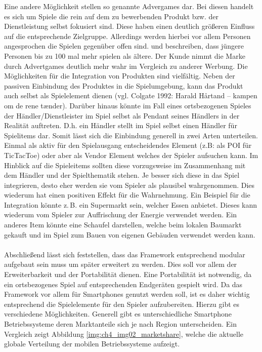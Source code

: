 Eine andere Möglichkeit stellen so genannte Advergames dar. Bei diesen handelt es sich um Spiele die rein auf dem zu bewerbenden Produkt bzw. der Dienstleistung selbst fokusiert sind. Diese haben einen deutlich größeren Einfluss auf die entsprechende Zielgruppe. Allerdings werden hierbei vor allem Personen angesprochen die Spielen gegenüber offen sind.\cite{Winkler.2006} \textcite{Chen.2001} und \textcite{Dahl.2009} beschreiben, dass jüngere Personen bis zu 100 mal mehr spielen als ältere. Der Kunde nimmt die Marke durch Advertgames deutlich mehr wahr im Vergleich zu anderer Werbung.
Die Möglichkeiten für die Integration von Produkten sind vielfältig. Neben der passiven Einbindung des Produktes in die Spielumgebung, kann das Produkt auch selbst als Spielelement dienen (vgl. Colgate 1992: Harald Hårtand -- kampen om de rene tænder).
Darüber hinaus könnte im Fall eines ortsbezogenen Spieles der Händler/Dienstleister im Spiel selbst als Pendant seines Händlers in der Realität auftreten. D.h. ein Händler stellt im Spiel selbst einen Händler für Spielitems dar.
Somit lässt sich die Einbindung generell in zwei Arten unterteilen. Einmal als aktiv für den Spielausgang entscheidendes Element (z.B: als POI für TicTacToe) oder aber als Vendor Element welches der Spieler aufsuchen kann.
Im Hinblick auf die Spieleitems sollten diese vorzugsweise im Zusammenhang mit dem Händler und der Spielthematik stehen. Je besser sich diese in das Spiel integrieren, desto eher werden sie vom Spieler als plausibel wahrgenommen. Dies wiederum hat einen positiven Effekt für die Wahrnehmung.
Ein Beispiel für die Integration könnte z.\,B. ein Supermarkt sein, welcher Essen anbietet. Dieses kann wiederum vom Spieler zur Auffrischung der Energie verwendet werden. Ein anderes Item könnte eine Schaufel darstellen, welche beim lokalen Baumarkt gekauft und im Spiel zum Bauen von eigenen Gebäuden verwendet werden kann.
\\\\
Abschließend lässt sich feststellen, dass das Framework entsprechend modular aufgebaut sein muss um später erweitert zu werden. Dies soll vor allem der Erweiterbarkeit und der Portabilität dienen. Eine Portabilität ist notwendig, da ein ortsbezogenes Spiel auf entsprechenden Endgeräten gespielt wird. Da das Framework vor allem  für Smartphones genutzt werden soll, ist es daher wichtig entsprechend die Spielelemente für den Spieler aufzubereiten. Hierzu gibt es verschiedene Möglichkeiten.
Generell gibt es unterschiedliche Smartphone Betriebssysteme deren Marktanteile sich je nach Region unterscheiden.
Ein Vergleich zeigt Abbildung \ref{img:ch4_img02_marketshare}, welche die aktuelle globale Verteilung der mobilen Betriebssysteme aufzeigt.

